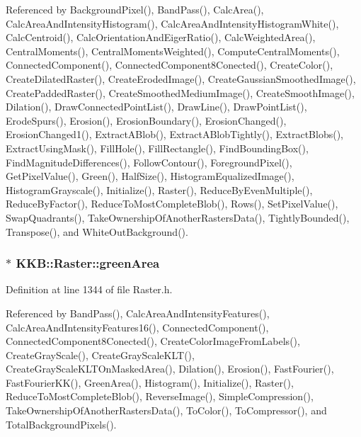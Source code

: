 Referenced by Background\+Pixel(), Band\+Pass(), Calc\+Area(), Calc\+Area\+And\+Intensity\+Histogram(), Calc\+Area\+And\+Intensity\+Histogram\+White(), Calc\+Centroid(), Calc\+Orientation\+And\+Eiger\+Ratio(), Calc\+Weighted\+Area(), Central\+Moments(), Central\+Moments\+Weighted(), Compute\+Central\+Moments(), Connected\+Component(), Connected\+Component8\+Conected(), Create\+Color(), Create\+Dilated\+Raster(), Create\+Eroded\+Image(), Create\+Gaussian\+Smoothed\+Image(), Create\+Padded\+Raster(), Create\+Smoothed\+Medium\+Image(), Create\+Smooth\+Image(), Dilation(), Draw\+Connected\+Point\+List(), Draw\+Line(), Draw\+Point\+List(), Erode\+Spurs(), Erosion(), Erosion\+Boundary(), Erosion\+Changed(), Erosion\+Changed1(), Extract\+A\+Blob(), Extract\+A\+Blob\+Tightly(), Extract\+Blobs(), Extract\+Using\+Mask(), Fill\+Hole(), Fill\+Rectangle(), Find\+Bounding\+Box(), Find\+Magnitude\+Differences(), Follow\+Contour(), Foreground\+Pixel(), Get\+Pixel\+Value(), Green(), Half\+Size(), Histogram\+Equalized\+Image(), Histogram\+Grayscale(), Initialize(), Raster(), Reduce\+By\+Even\+Multiple(), Reduce\+By\+Factor(), Reduce\+To\+Most\+Complete\+Blob(), Rows(), Set\+Pixel\+Value(), Swap\+Quadrants(), Take\+Ownership\+Of\+Another\+Rasters\+Data(), Tightly\+Bounded(), Transpose(), and White\+Out\+Background().

\subsubsection[{\texorpdfstring{green\+Area}{greenArea}}]{$\ast$ K\+K\+B\+::\+Raster\+::green\+Area\hspace{0.3cm}{\ttfamily [protected]}}\hypertarget{class_k_k_b_1_1_raster_ad981258f1f7284a8bd0cd0466f328cdf}{}\label{class_k_k_b_1_1_raster_ad981258f1f7284a8bd0cd0466f328cdf}


Definition at line 1344 of file Raster.\+h.



Referenced by Band\+Pass(), Calc\+Area\+And\+Intensity\+Features(), Calc\+Area\+And\+Intensity\+Features16(), Connected\+Component(), Connected\+Component8\+Conected(), Create\+Color\+Image\+From\+Labels(), Create\+Gray\+Scale(), Create\+Gray\+Scale\+K\+L\+T(), Create\+Gray\+Scale\+K\+L\+T\+On\+Masked\+Area(), Dilation(), Erosion(), Fast\+Fourier(), Fast\+Fourier\+K\+K(), Green\+Area(), Histogram(), Initialize(), Raster(), Reduce\+To\+Most\+Complete\+Blob(), Reverse\+Image(), Simple\+Compression(), Take\+Ownership\+Of\+Another\+Rasters\+Data(), To\+Color(), To\+Compressor(), and Total\+Background\+Pixels().

